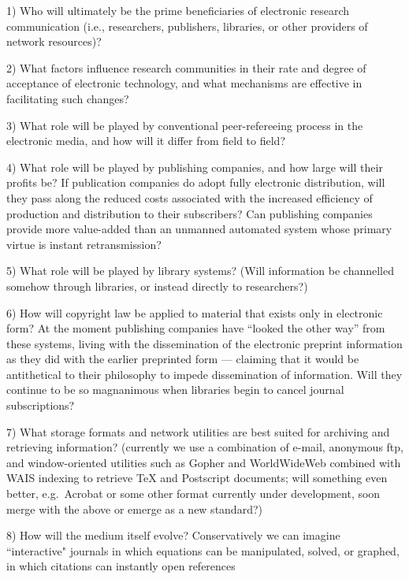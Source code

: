 \item{1)} Who will ultimately be the prime beneficiaries of electronic research
  communication (i.e., researchers, publishers, libraries, or other providers
  of network resources)?
\item{2)} What factors influence research communities in their rate and degree
   of acceptance of electronic technology, and what mechanisms are effective
   in facilitating such changes?
\item{3)} What role will be played by conventional peer-refereeing process in
  the electronic media, and how will it differ from field to field?
\item{4)} What role will be played by publishing companies, and how large
  will their profits be?
  If publication companies do adopt fully electronic distribution, will
  they pass along the reduced costs associated with the increased efficiency
  of production and distribution to their subscribers?
  Can publishing companies provide more value-added than an unmanned automated
  system whose primary virtue is instant retransmission?
\item{5)} What role will be played by library systems? (Will information be
  channelled somehow through libraries, or instead directly to researchers?)
\item{6)} How will copyright law be applied to material that exists only in
  electronic form? At the moment publishing companies have ``looked the other
  way'' from these systems, living with the dissemination of the
  electronic preprint information as they did with the earlier preprinted form
  --- claiming that it would be antithetical to their
  philosophy to impede dissemination of information.  Will they continue to
  be so magnanimous when libraries begin to cancel journal subscriptions?
\item{7)} What storage formats and network utilities are best suited for
  archiving and retrieving information? (currently we use a combination of
  e-mail, anonymous ftp, and window-oriented utilities such as Gopher and
  WorldWideWeb combined with WAIS indexing to retrieve TeX and Postscript
  documents; will something even better, e.g.\ Acrobat or some other
  format currently under development, soon merge with the above or
  emerge as a new standard?)
\item{8)} How will the medium itself evolve? Conservatively we can imagine
  ``interactive" journals in which equations can be manipulated, solved, or
  graphed, in which citations can instantly open references
